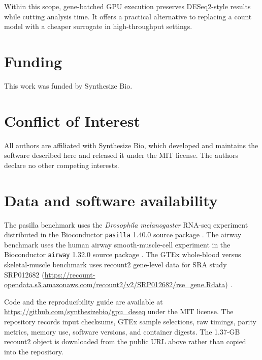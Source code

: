 \documentclass[12pt]{article}
\begin{document}
Within this scope, gene-batched GPU execution preserves DESeq2-style results
while cutting analysis time. It offers a practical alternative to replacing a
count model with a cheaper surrogate in high-throughput settings.





\section*{Funding}
This work was funded by Synthesize Bio.

\section*{Conflict of Interest}
All authors are affiliated with Synthesize Bio, which developed and maintains
the software described here and released it under the MIT license. The authors
declare no other competing interests.

\section*{Data and software availability}
\begin{sloppypar}
The pasilla benchmark uses the \textit{Drosophila melanogaster} RNA-seq
experiment distributed in the Bioconductor \texttt{pasilla} 1.40.0 source
package \citep{brooks2011pasilla}.
The airway benchmark uses the human airway smooth-muscle-cell experiment in
the Bioconductor \texttt{airway} 1.32.0 source package
\citep{himes2014airway}.
The GTEx whole-blood versus skeletal-muscle benchmark uses recount2 gene-level
data for SRA study SRP012682
(\url{https://recount-opendata.s3.amazonaws.com/recount2/v2/SRP012682/rse_gene.Rdata})
\citep{gtex2020atlas,colladotorres2017recount2}.

Code and the reproducibility guide are available at
\url{https://github.com/synthesizebio/gpu_deseq} under the MIT license. The
repository records input checksums, GTEx sample selections, raw timings, parity
metrics, memory use, software versions, and container digests. The 1.37-GB
recount2 object is downloaded from the public URL above rather than copied into
the repository.
\end{sloppypar}




\clearpage
\end{document}
